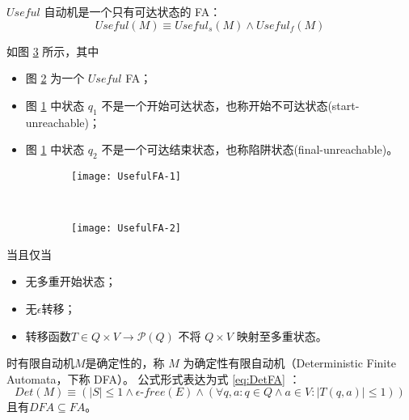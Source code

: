 \begin{definition}
    $Useful$ 自动机是一个只有可达状态的 FA：
    \[ Useful (M) \equiv Useful_s (M) \land Useful_f (M) \]
\end{definition}

\begin{example}
    如图 \ref{fig:UsefulFA} 所示，其中
    \begin{itemize}
        \item 图 \ref{fig:UsefulFA-2} 为一个 $Useful$ FA；
        \item 图 \ref{fig:UsefulFA-1} 中状态 $q_1$ 不是一个开始可达状态，也称开始不可达状态(start-unreachable)；
        \item 图 \ref{fig:UsefulFA-1} 中状态 $q_2$ 不是一个可达结束状态，也称陷阱状态(final-unreachable)\cite{book1}。
    \end{itemize}
\end{example}

\begin{figure}[!htbp]
    \centering
    \begin{subfigure}[b]{0.45\textwidth}
        \texttt{[image: UsefulFA-1]}
        \caption{}
        \label{fig:UsefulFA-1}
    \end{subfigure}
    ~
    \begin{subfigure}[b]{0.45\textwidth}
        \texttt{[image: UsefulFA-2]}
        \caption{}
        \label{fig:UsefulFA-2}
    \end{subfigure}
    \caption{}
    \label{fig:UsefulFA}
\end{figure}

\begin{definition}
    当且仅当 
    \begin{itemize}
        \item 无多重开始状态；
        \item 无$\epsilon$转移；
        \item 转移函数$T \in Q \times V \longrightarrow \mathcal{P} (Q) $ 不将 $Q \times V$ 映射至多重状态。
    \end{itemize}
    时有限自动机$M$是确定性的，称 $M$ 为确定性有限自动机（Deterministic Finite Automata，下称 DFA）。
    公式形式表达为式 \ref{eq:DetFA} ：
    \begin{equation}\label{eq:DetFA}
    Det(M) \equiv ( |S| \leq 1 \land \epsilon\mbox{-} free(E) \land ( \forall q,a:q \in Q \land a \in V : |T(q,a)| \leq 1 )) 
    \end{equation}
    且有$ DFA \subseteq FA$。
\end{definition}


